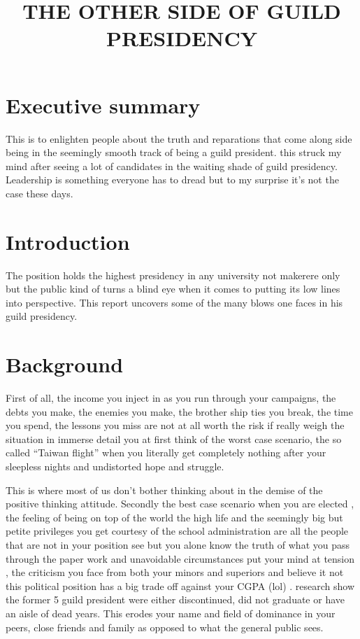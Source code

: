 \documentclass{article}
\begin{document}
\title{THE OTHER SIDE OF GUILD PRESIDENCY}
\maketitle
\section {Executive summary }{This is to enlighten people about the truth and reparations that come along side being in the seemingly smooth track of being a guild president. this struck my mind after seeing a lot of candidates in the waiting shade of guild presidency. Leadership is something everyone has to dread but to my surprise it’s not the case these days.
}
\section {Introduction} {The position holds the highest presidency in any university not makerere only but the public kind of turns a blind eye when it comes to putting its low lines into perspective. This report uncovers some of the many blows one faces in his guild presidency.
}
\section {Background} {First of all, the income you inject in as you run through your campaigns, the debts you make, the enemies you make, the brother ship ties you break, the time you spend, the lessons you miss are not at all worth the risk if really weigh the situation in immerse detail you at first think of the worst case scenario, the so called “Taiwan flight” when you literally get completely nothing after your sleepless nights and undistorted hope and struggle.} 

{
This is where most of us don’t bother thinking about in the demise of the positive thinking attitude. Secondly the best case scenario when you are elected , the feeling of being on top of the world the high life and the seemingly big but petite privileges you get courtesy of the school administration are all the people that are not in your position see but you alone know the truth of what you pass through the paper work and unavoidable circumstances put your mind at tension , the criticism you face from both your minors and superiors and believe it not this political position has a big trade off against your CGPA (lol) . research show the former 5 guild president were either discontinued, did not graduate or have an aisle of dead years. This erodes your name and field of dominance in your peers, close friends and family as opposed to what the general public sees.
}
\end{document}
